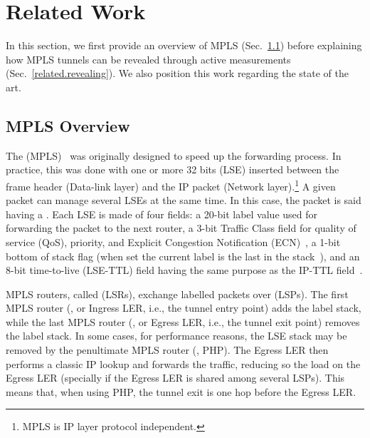 \section{Related Work}\label{related}
In this section, we first provide an overview of MPLS
(Sec.~\ref{related.overview}) before explaining how MPLS tunnels can be revealed
through active measurements (Sec.~\ref{related.revealing}).  We also position
this work regarding the state of the art.

\subsection{MPLS Overview}\label{related.overview}
The  (MPLS)~\cite{rfc3031} was originally
designed to speed up the forwarding process. In practice, this was done with one
or more 32 bits  (LSE) inserted between the frame
header (Data-link layer) and the IP packet (Network layer).\footnote{MPLS is IP
layer protocol independent.} A given packet can manage several LSEs at the same
time. In this case, the packet is said having a .  Each LSE
is made of four fields:  a 20-bit label value used for forwarding the packet to
the next router, a 3-bit Traffic Class field for quality of service (QoS),
priority, and Explicit Congestion Notification (ECN)~\cite{rfc5462}, a 1-bit
bottom of stack flag (when set the current label is the last in the
stack~\cite{rfc3032}), and an 8-bit time-to-live (LSE-TTL) field having the same
purpose as the IP-TTL field~\cite{rfc3443}.

MPLS routers, called  (LSRs), exchange labelled
packets over  (LSPs).   The first MPLS router
(, or Ingress LER, i.e., the tunnel entry point)
adds the label stack, while the last MPLS router (, or Egress LER, i.e., the tunnel exit point) removes the label stack.
In some cases, for performance reasons, the LSE stack may be removed by the
penultimate MPLS router (, PHP).  The Egress LER
then performs a classic IP lookup and forwards the traffic, reducing so the load
on the Egress LER (specially if the Egress LER is shared among several LSPs).
This means that, when using PHP, the tunnel exit is one hop before the Egress
LER. %

